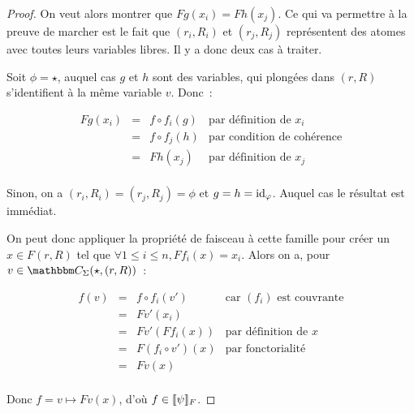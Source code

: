 \begin{proof}
    On veut alors montrer que $Fg(x_i) = Fh(x_j)$. Ce qui va permettre à la preuve de
    marcher est le fait que $(r_i,R_i)$ et $(r_j,R_j)$ représentent des atomes avec toutes
    leurs variables libres. Il y a donc deux cas à traiter.

    Soit $\phi = \star$, auquel cas $g$ et $h$ sont des variables, qui plongées dans 
    $(r,R)$ s'identifient à la même variable $v$. Donc~:
    
    \[\begin{array}{rcll}
        Fg(x_i) & = & f\circ f_i(g) & \text{par définition de } x_i     \\
                & = & f\circ f_j(h) & \text{par condition de cohérence} \\
                & = & Fh(x_j)       & \text{par définition de } x_j     \\
    \end{array}\]

    Sinon, on a $(r_i,R_i) = (r_j,R_j) = \phi$ et $g = h = \operatorname{id}_\varphi$. Auquel cas le
    résultat est immédiat.

    On peut donc appliquer la propriété de faisceau à cette famille pour créer un
    $x\in F(r,R)$ tel que $\forall 1\leq i\leq n, Ff_i(x) = x_i$. Alors on a, pour
    $v\in\C_\Sigma(\star,(r,R))$~:

    \[\begin{array}{rcll}
        f(v) & = & f\circ f_i(v') & \text{car $(f_i)$ est couvrante} \\
             & = & Fv'(x_i) & \\
             & = & Fv'(Ff_i(x)) & \text{par définition de } x \\
             & = & F(f_i\circ v')(x) & \text{par fonctorialité} \\
             & = & Fv(x) & \\
    \end{array}\]

    Donc $f = v\mapsto Fv(x)$, d'où $f\in\llbracket {\psi} \rrbracket_F$.
\end{proof}


